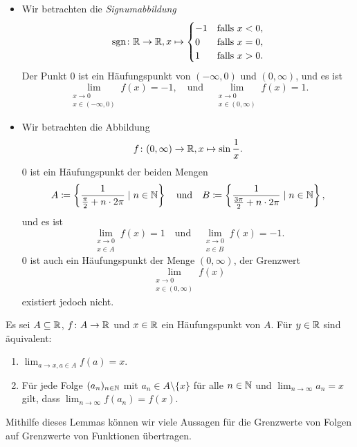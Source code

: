 \documentclass[a4paper,10pt]{article}
\begin{document}
\begin{bsp}
 \begin{itemize}
  \item
   Wir betrachten die \emph{Signumabbildung}
   \[
    \operatorname{sgn} \colon \mathbb{R} \to \mathbb{R},
    x \mapsto
    \begin{cases}
     -1 & \text{falls $x < 0$}, \\
      0 & \text{falls $x = 0$}, \\
      1 & \text{falls $x > 0$}.
    \end{cases}
   \]
   Der Punkt $0$ ist ein Häufungspunkt von $(-\infty,0)$ und $(0,\infty)$, und es ist
   \[
    \lim_{\substack{x \to 0 \\ x \in (-\infty, 0)}} f(x) = -1,
    \quad
    \text{und}
    \quad
    \lim_{\substack{x \to 0 \\ x \in (0, \infty)}} f(x) = 1.
   \]
  \item
   Wir betrachten die Abbildung
   \[
    f \colon (0,\infty) \to \mathbb{R}, x \mapsto \sin \frac{1}{x}.
   \]
   $0$ ist ein Häufungspunkt der beiden Mengen
   \[
    A \coloneqq \left\{ \frac{1}{\frac{\pi}{2} + n \cdot 2\pi} \mid n \in \mathbb{N} \right\}
    \quad
    \text{und}
    \quad
    B \coloneqq \left\{ \frac{1}{\frac{3\pi}{2} + n \cdot 2\pi} \mid n \in \mathbb{N} \right\},
   \]
   und es ist
   \[
    \lim_{\substack{x \to 0 \\ x \in A}} f(x) = 1
    \quad
    \text{und}
    \quad
    \lim_{\substack{x \to 0 \\ x \in B}} f(x) = -1.
   \]
   $0$ ist auch ein Häufungspunkt der Menge $(0,\infty)$, der Grenzwert
   \[
    \lim_{\substack{x \to 0 \\ x \in (0,\infty)}} f(x)
   \]
   existiert jedoch nicht.
 \end{itemize}
\end{bsp}


\begin{lem}
 Es sei $A \subseteq \mathbb{R}$, $f \colon A \to \mathbb{R}$ und $x \in \mathbb{R}$ ein Häufungspunkt von $A$. Für $y \in \mathbb{R}$ sind äquivalent:
 \begin{enumerate}
  \item
   $\lim_{a \to x, a \in A} f(a) = x$.
  \item
   Für jede Folge $(a_n)_{n \in \mathbb{N}}$ mit $a_n \in A \setminus \{x\}$ für alle $n \in \mathbb{N}$ und $\lim_{n \to \infty} a_n = x$ gilt, dass $\lim_{n \to \infty} f(a_n) = f(x)$.
 \end{enumerate}
\end{lem}


Mithilfe dieses Lemmas können wir viele Aussagen für die Grenzwerte von Folgen auf Grenzwerte von Funktionen übertragen.
\end{document}
